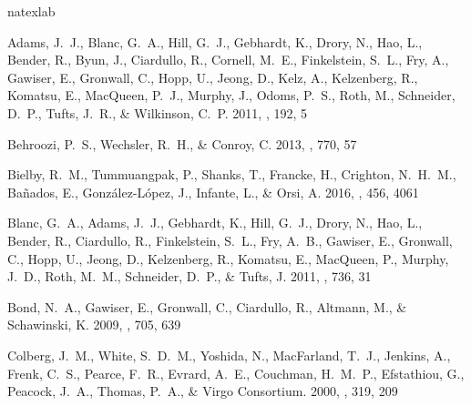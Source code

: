 \documentclass{emulateapj}
\begin{document}
\begin{thebibliography}{39}
\expandafter\ifx\csname natexlab\endcsname\relax\def\natexlab#1{#1}\fi

{Adams}, J.~J., {Blanc}, G.~A., {Hill}, G.~J., {Gebhardt}, K., {Drory}, N.,
  {Hao}, L., {Bender}, R., {Byun}, J., {Ciardullo}, R., {Cornell}, M.~E.,
  {Finkelstein}, S.~L., {Fry}, A., {Gawiser}, E., {Gronwall}, C., {Hopp}, U.,
  {Jeong}, D., {Kelz}, A., {Kelzenberg}, R., {Komatsu}, E., {MacQueen}, P.~J.,
  {Murphy}, J., {Odoms}, P.~S., {Roth}, M., {Schneider}, D.~P., {Tufts}, J.~R.,
  \& {Wilkinson}, C.~P. 2011, \apjs, 192, 5

{Behroozi}, P.~S., {Wechsler}, R.~H., \& {Conroy}, C. 2013, \apj, 770, 57

{Bielby}, R.~M., {Tummuangpak}, P., {Shanks}, T., {Francke}, H., {Crighton},
  N.~H.~M., {Ba{\~n}ados}, E., {Gonz{\'a}lez-L{\'o}pez}, J., {Infante}, L., \&
  {Orsi}, A. 2016, \mnras, 456, 4061

{Blanc}, G.~A., {Adams}, J.~J., {Gebhardt}, K., {Hill}, G.~J., {Drory}, N.,
  {Hao}, L., {Bender}, R., {Ciardullo}, R., {Finkelstein}, S.~L., {Fry}, A.~B.,
  {Gawiser}, E., {Gronwall}, C., {Hopp}, U., {Jeong}, D., {Kelzenberg}, R.,
  {Komatsu}, E., {MacQueen}, P., {Murphy}, J.~D., {Roth}, M.~M., {Schneider},
  D.~P., \& {Tufts}, J. 2011, \apj, 736, 31

{Bond}, N.~A., {Gawiser}, E., {Gronwall}, C., {Ciardullo}, R., {Altmann}, M.,
  \& {Schawinski}, K. 2009, \apj, 705, 639

{Colberg}, J.~M., {White}, S.~D.~M., {Yoshida}, N., {MacFarland}, T.~J.,
  {Jenkins}, A., {Frenk}, C.~S., {Pearce}, F.~R., {Evrard}, A.~E., {Couchman},
  H.~M.~P., {Efstathiou}, G., {Peacock}, J.~A., {Thomas}, P.~A., \& {Virgo
  Consortium}. 2000, \mnras, 319, 209


\end{thebibliography}
\end{document}
